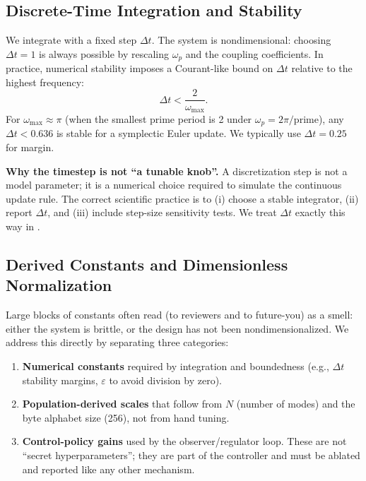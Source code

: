 \documentclass[11pt,a4paper]{article}
\newcommand{\dt}{\Delta t}
\newcommand{\eps}{\varepsilon}
\begin{document}
\subsection{Discrete-Time Integration and Stability}
\label{subsec:integration}

We integrate  with a fixed step $\dt$. The system is nondimensional: choosing $\dt=1$ is always possible by rescaling $\omega_p$ and the coupling coefficients. In practice, numerical stability imposes a Courant-like bound on $\dt$ relative to the highest frequency:
\begin{equation}
\dt < \frac{2}{\omega_{\max}}.
\label{eq:dt_bound}
\end{equation}
For $\omega_{\max}\approx \pi$ (when the smallest prime period is 2 under $\omega_p=2\pi/\text{prime}$), any $\dt<0.636$ is stable for a symplectic Euler update. We typically use $\dt=0.25$ for margin.

\begin{caveatbox}
\textbf{Why the timestep is not ``a tunable knob''.}
A discretization step is not a model parameter; it is a numerical choice required to simulate the continuous update rule. The correct scientific practice is to (i) choose a stable integrator, (ii) report $\dt$, and (iii) include step-size sensitivity tests. We treat $\dt$ exactly this way in .
\end{caveatbox}


\subsection{Derived Constants and Dimensionless Normalization}
\label{sec:derived_constants}

Large blocks of constants often read (to reviewers and to future-you) as a smell: either the system is brittle, or the design has not been nondimensionalized. We address this directly by separating three categories:

\begin{enumerate}[nosep]
  \item \textbf{Numerical constants} required by integration and boundedness (e.g., $\dt$ stability margins, $\eps$ to avoid division by zero).
  \item \textbf{Population-derived scales} that follow from $N$ (number of modes) and the byte alphabet size (256), not from hand tuning.
  \item \textbf{Control-policy gains} used by the observer/regulator loop. These are not ``secret hyperparameters''; they are part of the controller and must be ablated and reported like any other mechanism.
\end{enumerate}
\end{document}
